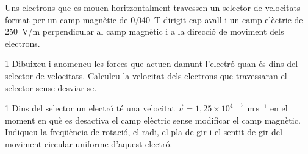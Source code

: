 Uns electrons que es mouen horitzontalment travessen un selector de velocitats format per un camp magnètic de 0,040~T dirigit cap avall i un camp elèctric de 250~V/m perpendicular al camp magnètic i a la direcció de moviment dels electrons.


\begin{apartat}{1}
Dibuixeu i anomeneu les forces que actuen damunt l'electró quan és dins del selector de velocitats. Calculeu la velocitat dels electrons que travessaran el selector sense desviar-se.
\end{apartat}

\begin{apartat}{1}
Dins del selector un electró té una velocitat $\vec{v} = 1,25\times 10^{4}\,\vec{\imath}\ \mathrm{m\,s^{-1}}$ en el moment en què es desactiva el camp elèctric sense modificar el camp magnètic. Indiqueu la freqüència de rotació, el radi, el pla de gir i el sentit de gir del moviment circular uniforme d'aquest electró.
\end{apartat}

